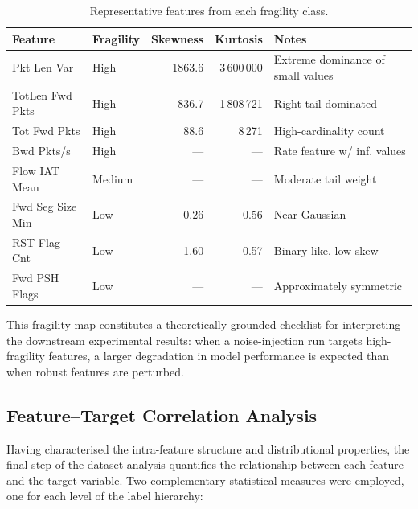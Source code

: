 \begin{table}[htbp]
  \centering
  \caption{Representative features from each fragility class.}
  \label{tab:fragility-examples}
  \small
  \begin{tabular}{llrrl}
    \toprule
    \textbf{Feature} & \textbf{Fragility} & \textbf{Skewness} & \textbf{Kurtosis} & \textbf{Notes} \\
    \midrule
    Pkt Len Var            & High    & 1863.6  & 3\,600\,000 & Extreme dominance of small values \\
    TotLen Fwd Pkts        & High    & 836.7   & 1\,808\,721 & Right-tail dominated \\
    Tot Fwd Pkts           & High    & 88.6    & 8\,271      & High-cardinality count \\
    Bwd Pkts/s             & High    & —       & —           & Rate feature w/ inf. values \\
    \midrule
    Flow IAT Mean          & Medium  & —       & —           & Moderate tail weight \\
    \midrule
    Fwd Seg Size Min       & Low     & 0.26    & 0.56        & Near-Gaussian \\
    RST Flag Cnt           & Low     & 1.60    & 0.57        & Binary-like, low skew \\
    Fwd PSH Flags          & Low     & —       & —           & Approximately symmetric \\
    \bottomrule
  \end{tabular}
\end{table}

This fragility map constitutes a theoretically grounded checklist for
interpreting the downstream experimental results: when a noise-injection run
targets high-fragility features, a larger degradation in model performance is
expected than when robust features are perturbed.

\subsection{Feature–Target Correlation Analysis}
\label{sec:feat-target-corr}

Having characterised the intra-feature structure and distributional properties,
the final step of the dataset analysis quantifies the relationship between each
feature and the target variable.  Two complementary statistical measures were
employed, one for each level of the label hierarchy:

